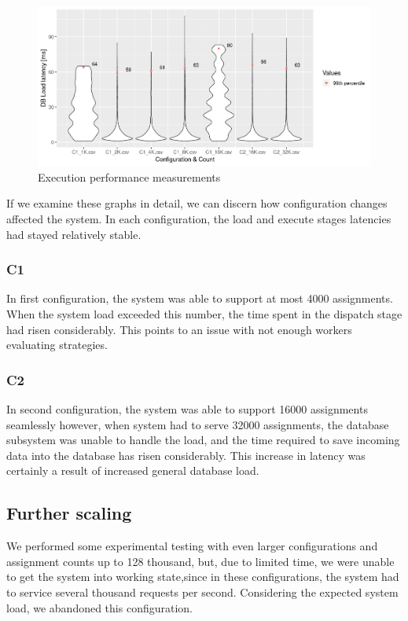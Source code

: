 \begin{figure}[H]
    \centering
    \includegraphics[width=1\textwidth]{obrazky-figures/exec.png}
    \caption{Execution performance measurements}
    \label{img:measure_exec}
\end{figure}


If we examine these graphs in detail, we can discern how configuration changes affected the system.
In each configuration, the load and execute stages latencies had stayed relatively stable.

\subsubsection{C1}
In first configuration, the system was able to support at most 4000 assignments. When the system load
exceeded this number, the time spent in the dispatch stage had risen considerably. This points to an issue with
not enough workers evaluating strategies.

\subsubsection{C2}
In second configuration, the system was able to support 16000 assignments seamlessly however, when system had to
serve 32000 assignments, the database subsystem was unable to handle the load, and the time required to save
incoming data into the database has risen considerably. This increase in latency was certainly a result of
increased general database load.

\subsection{Further scaling}
We performed some experimental testing with even larger configurations and assignment counts up to 128 thousand,
but, due to limited time, we were unable to get the system into working state,since in these configurations,
the system had to service several thousand requests per second. Considering the expected system load,
we abandoned this configuration.

